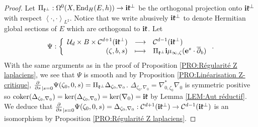 \documentclass{article}
\theoremstyle{remark}
\theoremstyle{definition}
\newcommand{\coker}{\mathrm{coker}}
\newcommand{\End}{\mathrm{End}}
\renewcommand{\i}{\boldsymbol{\mathrm{i}}}
\newcommand{\e}{\boldsymbol{\mathrm{e}}}
\newcommand{\scal}[2]{\left< #1,#2 \right>}
\newcommand{\mC}{\mathcal{C}}
\newcommand{\mU}{\mathcal{U}}
\newcommand{\dbar}{\overline{\partial}}
\newcommand{\fonction}[4]{\left\{ \begin{array}{rcl}
		\displaystyle #1 & \longrightarrow & \displaystyle #2\\
		\displaystyle #3 & \longmapsto & \displaystyle #4
	\end{array} \right.}
\begin{document}
\begin{proof}
Let $\Pi_{\frak{k}^\bot} : \Omega^0(X,\End_H(E,h)) \rightarrow \i\frak{k}^\bot$ be the orthogonal projection onto $\i\frak{k}^\bot$ with respect $\scal{\cdot}{\cdot}_{L^2}$. Notice that we write abusively $\i\frak{k}^\bot$ to denote Hermitian global sections of $E$ which are orthogonal to $\i\frak{k}$. Let
$$
\Psi : \fonction{\mU_d \times B \times \mC^{d + 1}(\i\frak{k}^\bot)}{\mC^{d - 1}(\i\frak{k}^\bot)}{(\zeta,b,s)}{\Pi_{\frak{k}^\bot}\i\mu_{\infty,\zeta}(\e^s \cdot \dbar_b)}.
$$
With the same arguments as in the proof of Proposition \ref{PRO:Régularité Z laplaciens}, we see that $\Psi$ is smooth and by Proposition \ref{PRO:Linéarisation Z-critique}, $\frac{\partial}{\partial s}_{|s = 0}\Psi(\zeta_0,0,s) = \Pi_{\frak{k}^\bot}\Delta_{\zeta_0,\nabla_0}$. $\Delta_{\zeta_0,\nabla_0} = \nabla_{0,\zeta_0}^*\nabla_0$ is symmetric positive so $\coker(\Delta_{\zeta_0,\nabla_0}) = \ker(\Delta_{\zeta_0,\nabla_0}) = \ker(\nabla_0) = \i\frak{k}$ by Lemma \ref{LEM:Aut réductif}. We deduce that $\frac{\partial}{\partial s}_{|s = 0}\Psi(\zeta_0,0,s) = \Delta_{\zeta_0,\nabla_0} : \mC^{d + 1}(\i\frak{k}^\bot) \rightarrow \mC^{d - 1}(\i\frak{k}^\bot)$ is an isomorphism by Proposition \ref{PRO:Régularité Z laplaciens}.


\end{proof}
\end{document}

